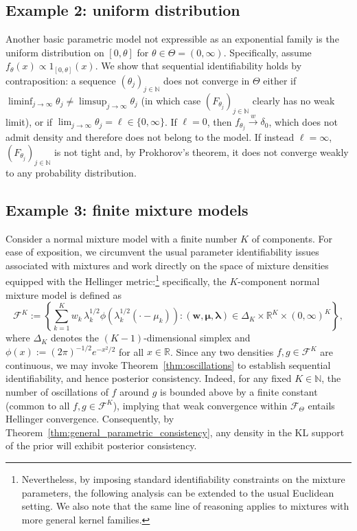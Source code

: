 \documentclass[11pt,twoside]{article}
\newcommand{\wc}{\overset{w}{\longrightarrow}}
\def\RR{\mathbb{R}}
\def\NN{\mathbb{N}}
\begin{document}
\subsection{Example 2: uniform distribution}

Another basic parametric model not expressible as an exponential family is the uniform distribution on $[0,\theta]$ for $\theta \in \Theta = (0, \infty)$. Specifically, assume $f_\theta(x) \propto 1_{[0,\theta]}(x)$. We show that sequential identifiability holds by contraposition: a sequence $(\theta_j)_{j\in\NN}$ does not converge in $\Theta$ either if $\liminf_{j\to\infty}\theta_j\neq\limsup_{j\to\infty}\theta_j$ (in which case $(F_{\theta_j})_{j\in\NN}$ clearly has no weak limit), or if $\lim_{j\to\infty}\theta_j = \ell \in\{0,\infty\}$. If $\ell=0$, then $f_{\theta_j}\wc \delta_0$, which does not admit density and therefore does not belong to the model. If instead $\ell=\infty$, $(F_{\theta_j})_{j\in\NN}$ is not tight and, by Prokhorov's theorem, it does not converge weakly to any probability distribution.


\subsection{Example 3: finite mixture models}

Consider a normal mixture model with a finite number $K$ of components. For ease of exposition, we circumvent the usual parameter identifiability issues associated with mixtures \citep{teicher1963identifiability} and work directly on the space of mixture densities equipped with the Hellinger metric:\footnote{Nevertheless, by imposing standard identifiability constraints on the mixture parameters, the following analysis can be extended to the usual Euclidean setting. We also note that the same line of reasoning applies to mixtures with more general kernel families.} specifically, the $K$-component normal mixture model is defined as
%
\begin{equation*}
    \mathcal F^K := \left\{\sum_{k=1}^K w_k\, \lambda_k^{1/2}\phi\left(\lambda_k^{1/2}(\cdot-\mu_k)\right) : (\boldsymbol{w}, \boldsymbol{\mu}, \boldsymbol{\lambda}) \in\Delta_K\times\RR^K\times(0,\infty)^K \right\},
\end{equation*}
%
where $\Delta_K$ denotes the $(K-1)$-dimensional simplex and $\phi(x) := (2\pi)^{-1/2}e^{-x^2/2}$ for all $x \in \RR$. Since any two densities $f, g \in \mathcal F^K$ are continuous, we may invoke Theorem~\ref{thm:oscillations} to establish sequential identifiability, and hence posterior consistency. Indeed, for any fixed $K \in \NN$, the number of oscillations of $f$ around $g$ is bounded above by a finite constant (common to all $f,g\in\mathcal F^K$), implying that weak convergence within $\mathcal F_\Theta$ entails Hellinger convergence. Consequently, by Theorem~\ref{thm:general_parametric_consistency}, any density in the KL support of the prior will exhibit posterior consistency.
\end{document}

